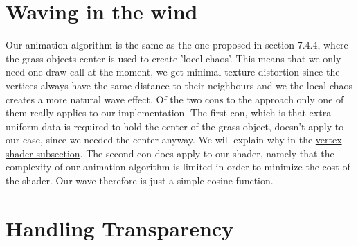 





\section{Waving in the wind}

Our animation algorithm is the same as the one proposed in section
7.4.4, where the grass objects center is used to create 'locel
chaos'. This means that we only need one draw call at the moment, we
get minimal texture distortion since the vertices always have the same
distance to their neighbours and we the local chaos creates a more
natural wave effect. Of the two cons to the approach only one of them
really applies to our implementation. The first con, which is that
extra uniform data is required to hold the center of the grass object,
doesn't apply to our case, since we needed the center anyway. We will
explain why in the \hyperref[sec:grassVert]{vertex shader
  subsection}. The second con does apply to our shader, namely that
the complexity of our animation algorithm is limited in order to
minimize the cost of the shader. Our wave therefore is just a simple
cosine function.



\section{Handling Transparency}\label{sec:transparency}








